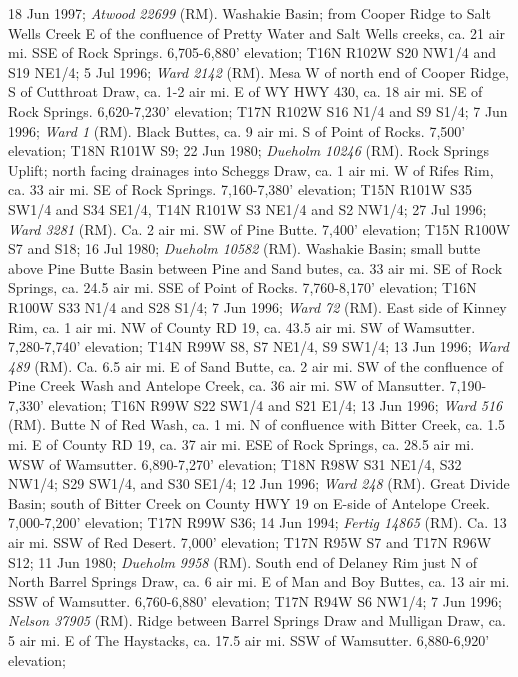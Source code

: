 18 Jun 1997; \textit{Atwood 22699} (RM).
Washakie Basin; from Cooper Ridge to Salt Wells Creek E of the confluence of
Pretty Water and Salt Wells creeks, ca. 21 air mi. SSE of Rock Springs.
6,705-6,880' elevation; T16N R102W S20 NW1/4 and S19 NE1/4; 5 Jul 1996;
\textit{Ward 2142} (RM).
Mesa W of north end of Cooper Ridge, S of Cutthroat Draw, ca. 1-2 air mi. E of
WY HWY 430, ca. 18 air mi. SE of Rock Springs. 6,620-7,230' elevation;
T17N R102W S16 N1/4 and S9 S1/4; 7 Jun 1996; \textit{Ward 1} (RM).
Black Buttes, ca. 9 air mi. S of Point of Rocks. 7,500' elevation; T18N R101W S9;
22 Jun 1980; \textit{Dueholm 10246} (RM).
Rock Springs Uplift; north facing drainages into Scheggs Draw, ca. 1 air mi. W
of Rifes Rim, ca. 33 air mi. SE of Rock Springs. 7,160-7,380' elevation;
T15N R101W S35 SW1/4 and S34 SE1/4, T14N R101W S3 NE1/4 and S2 NW1/4;
27 Jul 1996; \textit{Ward 3281} (RM).
Ca. 2 air mi. SW of Pine Butte. 7,400' elevation; T15N R100W S7 and S18;
16 Jul 1980; \textit{Dueholm 10582} (RM).
Washakie Basin; small butte above Pine Butte Basin between Pine and Sand butes,
ca. 33 air mi. SE of Rock Springs, ca. 24.5 air mi. SSE of Point of Rocks.
7,760-8,170' elevation; T16N R100W S33 N1/4 and S28 S1/4; 7 Jun 1996;
\textit{Ward 72} (RM).
East side of Kinney Rim, ca. 1 air mi. NW of County RD 19, ca.
43.5 air mi. SW of Wamsutter. 7,280-7,740' elevation; T14N R99W S8, S7 NE1/4,
S9 SW1/4; 13 Jun 1996; \textit{Ward 489} (RM).
Ca. 6.5 air mi. E of Sand Butte, ca. 2 air mi. SW of the
confluence of Pine Creek Wash and Antelope Creek, ca. 36 air mi. SW of Mansutter.
7,190-7,330' elevation; T16N R99W S22 SW1/4 and S21 E1/4; 13 Jun 1996;
\textit{Ward 516} (RM).
Butte N of Red Wash, ca. 1 mi. N of confluence with Bitter Creek,
ca. 1.5 mi. E of County RD 19, ca. 37 air mi. ESE of Rock Springs, ca. 28.5
air mi. WSW of Wamsutter. 6,890-7,270' elevation; T18N R98W S31 NE1/4,
S32 NW1/4; S29 SW1/4, and S30 SE1/4; 12 Jun 1996; \textit{Ward 248} (RM).
Great Divide Basin; south of Bitter Creek on County HWY 19 on E-side of
Antelope Creek. 7,000-7,200' elevation; T17N R99W S36; 14 Jun 1994;
\textit{Fertig 14865} (RM).
Ca. 13 air mi. SSW of Red Desert. 7,000' elevation; T17N R95W S7 and
T17N R96W S12; 11 Jun 1980; \textit{Dueholm 9958} (RM).
South end of Delaney Rim just N of North Barrel Springs Draw, ca. 6 air mi. E of
Man and Boy Buttes, ca. 13 air mi. SSW of Wamsutter. 6,760-6,880' elevation;
T17N R94W S6 NW1/4; 7 Jun 1996; \textit{Nelson 37905} (RM).
Ridge between Barrel Springs Draw and Mulligan Draw, ca. 5 air mi. E of The
Haystacks, ca. 17.5 air mi. SSW of Wamsutter. 6,880-6,920' elevation;
